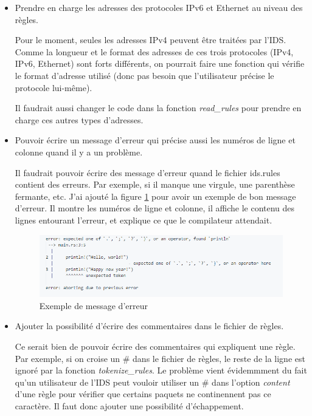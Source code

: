 \documentclass[a4paper]{article}
\begin{document}
\begin{itemize}
    \item Prendre en charge les adresses des protocoles IPv6 et Ethernet au niveau des règles.
    \begin{example}
        Pour le moment, seules les adresses IPv4 peuvent être traitées par l'IDS. Comme la longueur et le format des adresses de ces trois protocoles (IPv4, IPv6, Ethernet) sont forts différents, on pourrait faire une fonction qui vérifie le format d'adresse utilisé (donc pas besoin que l'utilisateur précise le protocole lui-même).

        Il faudrait aussi changer le code dans la fonction \textit{read\_rules} pour prendre en charge ces autres types d'adresses.
    \end{example}
    \item Pouvoir écrire un message d'erreur qui précise aussi les numéros de ligne et colonne quand il y a un problème.
    \begin{example}
        Il faudrait pouvoir écrire des message d'erreur quand le fichier ids.rules contient des erreurs. Par exemple, si il manque une virgule, une parenthèse fermante, etc. J'ai ajouté la figure \ref{fig:exerreur} pour avoir un exemple de bon message d'erreur. Il montre les numéros de ligne et colonne, il affiche  le contenu des lignes entourant l'erreur, et explique ce que le compilateur attendait.
        \begin{figure}[H]
            \centering
            \includegraphics[width=0.90\linewidth]{images/exemple-erreur.PNG}
            \caption{Exemple de message d'erreur}
            \label{fig:exerreur}
        \end{figure}
    \end{example}
    \item Ajouter la possibilité d'écrire des commentaires dans le fichier de règles.
    \begin{example}
        Ce serait bien de pouvoir écrire des commentaires qui expliquent une règle. Par exemple, si on croise un \# dans le fichier de règles, le reste de la ligne est ignoré par la fonction \textit{tokenize\_rules}. Le problème vient évidemmment du fait qu'un utilisateur de l'IDS peut vouloir utiliser un \# dans l'option \textit{content} d'une règle pour vérifier que certains paquets ne continennent pas ce caractère. Il faut donc ajouter une possibilité d'échappement.
    \end{example}
\end{itemize}
\end{document}
